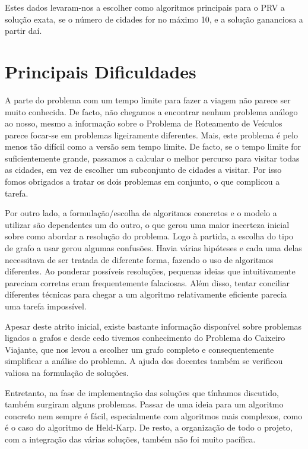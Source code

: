 \documentclass[12pt,a4paper,reqno]{report}
\numberwithin{equation}{section}
\begin{document}
Estes dados levaram-nos a escolher como algoritmos principais para o PRV a solução exata, se o número de cidades for no máximo 10, e a solução gananciosa a partir daí.

\chapter{Principais Dificuldades}

A parte do problema com um tempo limite para fazer a viagem não parece ser muito conhecida. De facto, não chegamos a encontrar nenhum problema análogo ao nosso, mesmo a informação sobre o Problema de Roteamento de Veículos parece focar-se em problemas ligeiramente diferentes. Mais, este problema é pelo menos tão difícil como a versão sem tempo limite. De facto, se o tempo limite for suficientemente grande, passamos a calcular o melhor percurso para visitar todas as cidades, em vez de escolher um subconjunto de cidades a visitar. Por isso fomos obrigados a tratar os dois problemas em conjunto, o que complicou a tarefa.

Por outro lado, a formulação/escolha de algoritmos concretos e o modelo a utilizar são dependentes um do outro, o que gerou uma maior incerteza inicial sobre como abordar a resolução do problema. Logo à partida, a escolha do tipo de grafo a usar gerou algumas confusões. Havia várias hipóteses e cada uma delas necessitava de ser tratada de diferente forma, fazendo o uso de algoritmos diferentes. Ao ponderar possíveis resoluções, pequenas ideias que intuitivamente pareciam corretas eram frequentemente falaciosas. Além disso, tentar conciliar diferentes técnicas para chegar a um algoritmo relativamente eficiente parecia uma tarefa impossível.

Apesar deste atrito inicial, existe bastante informação disponível sobre problemas ligados a grafos e desde cedo tivemos conhecimento do Problema do Caixeiro Viajante, que nos levou a escolher um grafo completo e consequentemente simplificar a análise do problema. A ajuda dos docentes também se verificou valiosa na formulação de soluções.

Entretanto, na fase de implementação das soluções que tínhamos discutido, também surgiram alguns problemas. Passar de uma ideia para um algoritmo concreto nem sempre é fácil, especialmente com algoritmos mais complexos, como é o caso do algoritmo de Held-Karp. De resto, a organização de todo o projeto, com a integração das várias soluções, também não foi muito pacífica.
\end{document}
